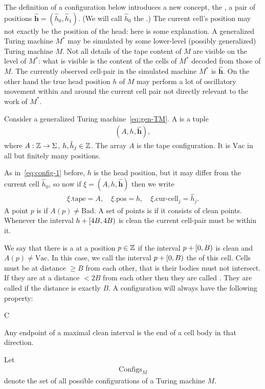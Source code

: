 \documentclass[11pt]{memoir}
\theoremstyle{definition} %
\renewcommand{\ge}{\geq}
\renewcommand{\vek}[1]{\mathbf{#1}}
\def\B{B}
\newcommand{\Bad}{\mathrm{Bad}}
\newcommand{\Vacant}{\mathrm{Vac}}
\newcommand{\Configs}{\mathrm{Configs}}
\newcommand{\h}{h}
\newcommand{\hc}{\hat h}
\newcommand{\vhc}{\vek{\hat h}}
\newcommand{\pos}{\mathrm{pos}}
\newcommand{\curcell}{\textrm{cur-cell}}
\newcommand{\tape}{\mathrm{tape}}
\begin{document}
The definition of a configuration below introduces a new concept, the ,
a pair of positions \( \vhc = (\hc_{0},\hc_{1}) \).
(We will call \( \hc_{0} \) the .)
The current cell's position may not exactly be the position of the head: here is some explanation.
A generalized Turing machine \( M^{*} \) may be simulated by some lower-level (possibly
generalized) Turing machine \( M \).
Not all details of the tape content of \( M \) are visible on the level of \( M^{*} \): what is visible
is the content of the cells of \( M^{*} \) decoded from those of \( M \).
The currently observed cell-pair in the simulated machine \( M^{*} \) is \( \vhc \).
On the other hand the true head position \( h \) of \( M \)
may perform a lot of oscillatory movement within and around the current cell pair
not directly relevant to the work of \( M^{*} \).

\begin{definition}[Configuration]\label{def:config}
     Consider a generalized Turing machine~\eqref{eq:gen-TM}.
    A  is a tuple
        \begin{align*}
             (A,\h,\vhc),
        \end{align*}
where \( A:\mathbb{Z}\to\Sigma \), \( \h,\hc_{j}\in\bbZ \).
The array \( A \) is the tape configuration.
It is \( \Vacant \) in all but finitely many positions.

As in~\eqref{eq:config-1} before, \( \h \) is the head position, but it may differ from the current cell
\( \hc_{0} \), so now if \(  \xi= (A,\h,\vhc) \) then we write
        \begin{align}\label{eq:config-2}
             \xi.\tape=A, \quad \xi.\pos=\h,\quad \xi.\curcell_{j}=\hc_{j}. 
        \end{align}
A point \( p \) is  if  \( A(p)\ne\Bad \).
A set of points is  if it consists of clean points.
Whenever the interval \( \h+\lint{4\B}{4\B} \) is clean the current cell-pair
must be within it.

We say that there is a  at a position \( p\in\mathbb{Z} \) if the interval
\( p+\lint{0}{\B} \) is clean and \( A(p)\ne \Vacant \).
In this case, we call the interval \( p+\lint{0}{\B} \) the  of this cell.
Cells must be at distance \( \ge\B \) from each other, that is their
bodies must not intersect.
If they are at a distance \( <2\B \) from each other then they are called .
They are called  if the distance is exactly \( \B \).
A configuration will always have the following property: %
\begin{varenum}{C}
\item\label{i:config.sharp-ends}
 Any endpoint of a maximal clean interval is the end of a cell body in that direction.
\end{varenum}
Let
    \begin{align*}
         \Configs_{M}
    \end{align*}
    denote the set of all possible configurations of a Turing machine \( M \).
\end{definition}
\end{document}
